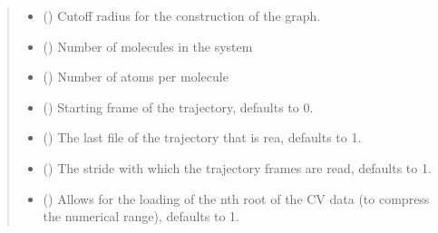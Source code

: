 \documentclass[a4paper,10pt,english]{report}
\begin{document}
\begin{fulllineitems}
\begin{quote}
\begin{description}
\begin{itemize}
\item {} 
\sphinxAtStartPar
{} () \textendash{} Cut\sphinxhyphen{}off radius for the construction of the graph.

\item {} 
\sphinxAtStartPar
{} () \textendash{} Number of molecules in the system

\item {} 
\sphinxAtStartPar
{} () \textendash{} Number of atoms per molecule

\item {} 
\sphinxAtStartPar
{} (\sphinxstyleliteralemphasis{\sphinxupquote{, }}) \textendash{} Starting frame of the trajectory, defaults to 0.

\item {} 
\sphinxAtStartPar
{} (\sphinxstyleliteralemphasis{\sphinxupquote{, }}) \textendash{} The last file of the trajectory that is rea, defaults to \sphinxhyphen{}1.

\item {} 
\sphinxAtStartPar
{} (\sphinxstyleliteralemphasis{\sphinxupquote{, }}) \textendash{} The stride with which the trajectory frames are read, defaults to 1.

\item {} 
\sphinxAtStartPar
{} (\sphinxstyleliteralemphasis{\sphinxupquote{, }}) \textendash{} Allows for the loading of the n\sphinxhyphen{}th root of the CV data (to compress the numerical range), defaults to 1.

\end{itemize}

\end{description}\end{quote}

\end{fulllineitems}
\end{document}
